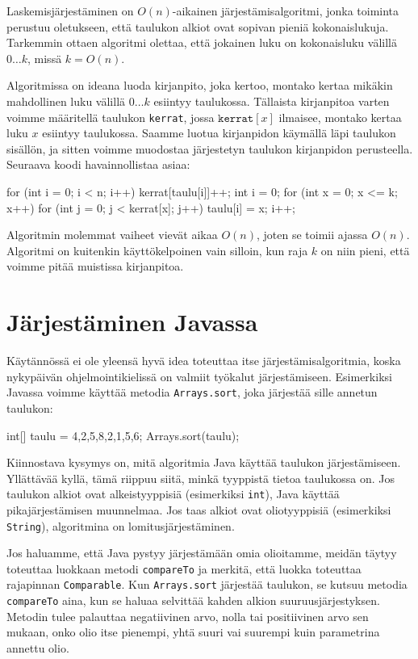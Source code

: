Laskemisjärjestäminen on $O(n)$-aikainen järjestämisalgoritmi,
jonka toiminta perustuu oletukseen, että taulukon alkiot
ovat sopivan pieniä kokonaislukuja.
Tarkemmin ottaen algoritmi olettaa, että jokainen luku on
kokonaisluku välillä $0 \dots k$, missä $k=O(n)$.

Algoritmissa on ideana luoda kirjanpito, joka kertoo,
montako kertaa mikäkin mahdollinen luku välillä $0 \dots k$
esiintyy taulukossa.
Tällaista kirjanpitoa varten voimme määritellä taulukon
\texttt{kerrat}, jossa $\texttt{kerrat}[x]$ ilmaisee,
montako kertaa luku $x$ esiintyy taulukossa.
Saamme luotua kirjanpidon käymällä läpi taulukon sisällön,
ja sitten voimme muodostaa järjestetyn taulukon
kirjanpidon perusteella.
Seuraava koodi havainnollistaa asiaa:

\begin{code}
for (int i = 0; i < n; i++) {
    kerrat[taulu[i]]++;
}
int i = 0;
for (int x = 0; x <= k; x++) {
    for (int j = 0; j < kerrat[x]; j++) {
        taulu[i] = x;
        i++;
    }
}
\end{code}

Algoritmin molemmat vaiheet vievät aikaa $O(n)$,
joten se toimii ajassa $O(n)$.
Algoritmi on kuitenkin käyttökelpoinen vain silloin,
kun raja $k$ on niin pieni, että voimme pitää
muistissa kirjanpitoa.

\section{Järjestäminen Javassa}

Käytännössä ei ole yleensä hyvä idea toteuttaa itse
järjestämisalgoritmia, koska nykypäivän ohjelmointikielissä
on valmiit työkalut järjestämiseen.
Esimerkiksi Javassa voimme käyttää metodia \texttt{Arrays.sort},
joka järjestää sille annetun taulukon:

\begin{code}
int[] taulu = {4,2,5,8,2,1,5,6};
Arrays.sort(taulu);
\end{code}

Kiinnostava kysymys on, mitä algoritmia Java käyttää
taulukon järjes\-tämiseen.
Yllättävää kyllä, tämä riippuu siitä, minkä tyyppistä tietoa
taulukossa on.
Jos taulukon alkiot ovat alkeistyyppisiä
(esimerkiksi \texttt{int}), Java käyttää 
pikajärjestämisen muunnelmaa.
Jos taas alkiot ovat oliotyyppisiä
(esimerkiksi \texttt{String}),
algoritmina on lomitusjärjestäminen.

Jos haluamme, että Java pystyy järjestämään omia olioitamme,
meidän täytyy toteuttaa luokkaan metodi \texttt{compareTo} ja
merkitä, että luokka toteuttaa rajapinnan \texttt{Comparable}.
Kun \texttt{Arrays.sort} järjestää taulukon,
se kutsuu metodia \texttt{compareTo} aina, kun se haluaa selvittää
kahden alkion suuruusjärjestyksen.
Metodin tulee palauttaa negatiivinen arvo, nolla tai positiivinen arvo
sen mukaan, onko olio itse pienempi, yhtä suuri vai suurempi
kuin parametrina annettu olio.


